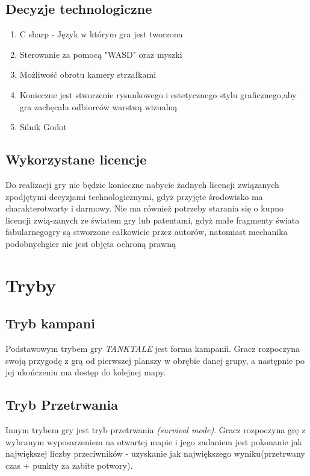 \documentclass{article}
\begin{document}
    \subsection{Decyzje technologiczne}
    \begin{enumerate}
       \item C sharp - Język w którym gra jest tworzona
    \item Sterowanie za pomocą "WASD" oraz myszki
     \item Możliwość obrotu kamery strzałkami
     \item Konieczne  jest  stworzenie  rysunkowego  i  estetycznego  stylu  graficznego,aby gra zachęcała odbiorców warstwą wizualną
     
      
    

    \item Silnik Godot
\end{enumerate}
\subsection{Wykorzystane licencje}
Do  realizacji  gry  nie  będzie  konieczne  nabycie  żadnych  licencji  związanych  zpodjętymi decyzjami technologicznymi, gdyż przyjęte środowisko ma charakterotwarty i darmowy. Nie ma również potrzeby starania się o kupno licencji zwią-zanych ze światem gry lub patentami, gdyż małe fragmenty świata fabularnegogry  są  stworzone  całkowicie  przez  autorów,  natomiast  mechanika  podobnychgier nie jest objęta ochroną prawną
\newpage

\section{Tryby}
    \subsection{Tryb kampani}
Podstawowym trybem gry \emph{TANKTALE} jest forma kampanii. Gracz rozpoczyna swoją przygodę z grą od pierwszej planszy w obrębie danej grupy, a następnie po jej ukończeniu ma dostęp do kolejnej mapy.
    \subsection{Tryb Przetrwania}
Innym trybem gry jest tryb przetrwania \emph{(survival mode)}. Gracz rozpoczyna grę z wybranym wyposarzeniem na otwartej mapie i jego zadaniem jest pokonanie jak największej liczby przeciwników - uzyskanie jak największego wyniku(przetrwany czas + punkty za zabite potwory).
    \newpage
    
\end{document}
